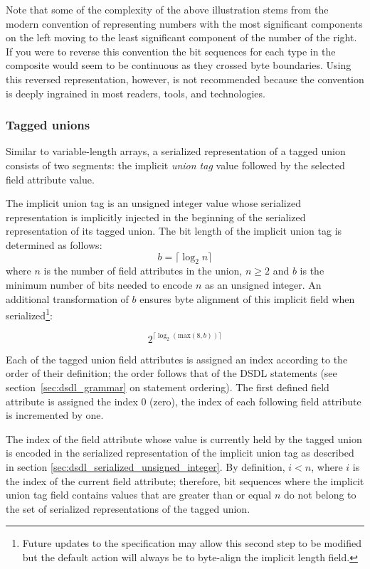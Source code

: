 \begin{remark}
    Note that some of the complexity of the above illustration stems from the modern convention of representing
    numbers with the most significant components on the left moving to the least significant component of the
    number of the right. If you were to reverse this convention the bit sequences for each type in the composite
    would seem to be continuous as they crossed byte boundaries. Using this reversed representation, however, is
    not recommended because the convention is deeply ingrained in most readers, tools, and technologies.
\end{remark}

\subsubsection{Tagged unions}

Similar to variable-length arrays, a serialized representation of a tagged union consists of two segments:
the implicit \emph{union tag} value followed by the selected field attribute value.

The implicit union tag is an unsigned integer value whose serialized representation
is implicitly injected in the beginning of the serialized representation of its tagged union.
The bit length of the implicit union tag is determined as follows:
$$b=\lceil{}\log_2 n\rceil{}$$
where $n$ is the number of field attributes in the union, $n \geq 2$ and $b$ is the minimum number of bits needed
to encode $n$ as an unsigned integer. An additional transformation of $b$ ensures byte alignment of this implicit
field when serialized\footnote{Future updates to the specification may allow this second step to be modified but
the default action will always be to byte-align the implicit length field.}:

$$2^{\lceil{}\log_2 (\text{max}(8, b))\rceil{}}$$

Each of the tagged union field attributes is assigned an index according to the order of their definition;
the order follows that of the DSDL statements (see section~\ref{sec:dsdl_grammar} on statement ordering).
The first defined field attribute is assigned the index 0 (zero),
the index of each following field attribute is incremented by one.

The index of the field attribute whose value is currently held by the tagged union is encoded
in the serialized representation of the implicit union tag as described in section
\ref{sec:dsdl_serialized_unsigned_integer}.
By definition, $i < n$, where $i$ is the index of the current field attribute;
therefore, bit sequences where the implicit union tag field contains values
that are greater than or equal $n$ do not belong to the set of serialized representations of the tagged union.

